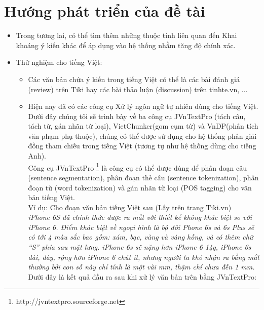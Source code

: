 \documentclass[12pt]{report}
\begin{document}
		\section*{Hướng phát triển của đề tài}		
		\begin{itemize}
			\item{Trong tương lai, có thể tìm thêm những thuộc tính liên quan đến Khai khoáng ý kiến khác để áp dụng vào hệ thống nhằm tăng độ chính xác.}
			\item{Thử nghiệm cho tiếng Việt:
				\begin{itemize}
					\item{Các văn bản chứa ý kiến trong tiếng Việt có thể là các bài đánh giá (review) trên Tiki hay các bài thảo luận (discussion) trên tinhte.vn, ...
					}
					\item{Hiện nay đã có các công cụ Xử lý ngôn ngữ tự nhiên dùng cho tiếng Việt. Dưới đây chúng tôi sẽ trình bày về ba công cụ JVnTextPro (tách câu, tách từ, gán nhãn từ loại), VietChunker(gom cụm từ) và VnDP(phân tích văn phạm phụ thuộc), chúng có thể được sử dụng cho hệ thống phân giải đồng tham chiếu trong tiếng Việt (tương tự như hệ thống dùng cho tiếng Anh).					
					\\Công cụ JVnTextPro \footnote{http://jvntextpro.sourceforge.net} là công cụ có thể được dùng để phân đoạn câu (sentence segmentation), phân đoạn thẻ câu (sentence tokenization), phân đoạn từ (word tokenization) và gán nhãn từ loại (POS tagging) cho văn bản tiếng Việt.
					\\Ví dụ: Cho đoạn văn bản tiếng Việt sau (Lấy trên trang Tiki.vn)
					\\\textit{iPhone 6S đã chính thức được ra mắt với thiết kế không khác biệt so với iPhone 6. Điểm khác biệt về ngoại hình là bộ đôi Phone 6s và 6s Plus sẽ có tới 4 màu sắc bao gồm: xám, bạc, vàng và vàng hồng, và có thêm chữ “S” phía sau mặt lưng. iPhone 6s sẽ nặng hơn iPhone 6 14g, iPhone 6s dài, dày, rộng hơn iPhone 6 chút ít, nhưng người ta khó nhận ra bằng mắt thường bởi con số này chỉ tính là một vài mm, thậm chí chưa đến 1 mm.}
					\\Dưới đây là kết quả đầu ra sau khi xử lý văn bản trên bằng JVnTextPro:
					\begin{figure}[H]
						\centering				
						\noindent{}
\end{figure}}
\end{itemize}}
\end{itemize}
\end{document}
